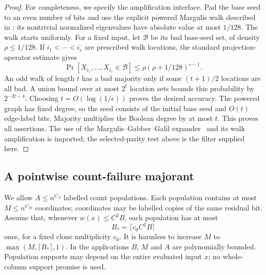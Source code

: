 \documentclass[11pt,letterpaper]{article}
\theoremstyle{definition}
\theoremstyle{remark}
\begin{document}
\begin{proof}
For completeness, we specify the amplification interface.  Pad the base
seed to an even number of bits and use the explicit powered Margulis
walk described in \cite[Appendix A.11]{NagCubic}; its nontrivial
normalized eigenvalues have absolute value at most $1/128$.
The walk starts uniformly.  For a fixed input, let $\mathcal B$ be its
bad base-seed set, of density $\rho\le1/128$.  If
$i_1<\cdots<i_s$ are prescribed walk locations, the standard
projection-operator estimate gives
\[
 \Pr[X_{i_1},\ldots,X_{i_s}\in\mathcal B]
 \le \rho(\rho+1/128)^{s-1}.
\]
An odd walk of length $t$ has a bad majority only if some
$(t+1)/2$ locations are all bad.  A union bound over at most $2^t$
location sets bounds this probability by $2^{-2t-4}$.
Choosing $t=O(\log(1/\epsilon))$ proves the desired accuracy.  The
powered graph has fixed degree, so the seed consists of the initial
base seed and $O(t)$ edge-label bits.  Majority multiplies the Boolean
degree by at most $t$.  This proves all assertions.  The use of the
Margulis--Gabber--Galil expander~\cite{Margulis,GabberGalil} and its walk amplification is imported;
the selected-parity test above is the filter supplied here.
\end{proof}

\subsection{A pointwise count-failure majorant}
\label{filt:hash-subsection}

We allow $A\le n^{C_A}$ labelled count populations.  Each population
contains at most $M\le n^{C_M}$ coordinates; coordinates may be labelled
copies of the same residual bit.  Assume that, whenever $w(x)\le C^2B$,
each population has at most
\[
 B_* = \lceil c_0 C^2 B\rceil
\]
ones, for a fixed clone multiplicity $c_0$.  It is harmless to increase
$M$ to $\max(M,\lceil B_*\rceil,1)$.  In the applications $B$, $M$ and
$A$ are polynomially bounded.  Population supports may depend on the
entire evaluated input $x$; no whole-column support promise is used.
\end{document}
